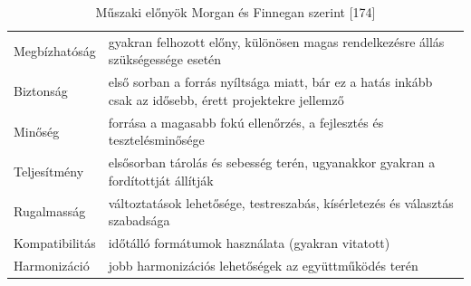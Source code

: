 \documentclass[12pt,magyar,a4paper,oneside]{scrreprt}
\begin{document}
\hypertarget{tbl:Elux151ny}{}
\begin{longtable}[]{@{}ll@{}}
\caption{\label{tbl:Elux151ny}Műszaki előnyök Morgan és Finnegan szerint
{[}174{]}}\tabularnewline
\toprule
\endhead
\begin{minipage}[t]{0.14\columnwidth}\raggedright
Megbízhatóság\strut
\end{minipage} & \begin{minipage}[t]{0.81\columnwidth}\raggedright
gyakran felhozott előny, különösen magas rendelkezésre állás
szükségessége esetén\strut
\end{minipage}\tabularnewline
\begin{minipage}[t]{0.14\columnwidth}\raggedright
Biztonság\strut
\end{minipage} & \begin{minipage}[t]{0.81\columnwidth}\raggedright
első sorban a forrás nyíltsága miatt, bár ez a hatás inkább csak az
idősebb, érett projektekre jellemző\strut
\end{minipage}\tabularnewline
\begin{minipage}[t]{0.14\columnwidth}\raggedright
Minőség\strut
\end{minipage} & \begin{minipage}[t]{0.81\columnwidth}\raggedright
forrása a magasabb fokú ellenőrzés, a fejlesztés és
tesztelésminősége\strut
\end{minipage}\tabularnewline
\begin{minipage}[t]{0.14\columnwidth}\raggedright
Teljesítmény\strut
\end{minipage} & \begin{minipage}[t]{0.81\columnwidth}\raggedright
elsősorban tárolás és sebesség terén, ugyanakkor gyakran a fordítottját
állítják\strut
\end{minipage}\tabularnewline
\begin{minipage}[t]{0.14\columnwidth}\raggedright
Rugalmasság\strut
\end{minipage} & \begin{minipage}[t]{0.81\columnwidth}\raggedright
változtatások lehetősége, testreszabás, kísérletezés és választás
szabadsága\strut
\end{minipage}\tabularnewline
\begin{minipage}[t]{0.14\columnwidth}\raggedright
Kompatibilitás\strut
\end{minipage} & \begin{minipage}[t]{0.81\columnwidth}\raggedright
időtálló formátumok használata (gyakran vitatott)\strut
\end{minipage}\tabularnewline
\begin{minipage}[t]{0.14\columnwidth}\raggedright
Harmonizáció\strut
\end{minipage} & \begin{minipage}[t]{0.81\columnwidth}\raggedright
jobb harmonizációs lehetőségek az együttműködés terén\strut
\end{minipage}\tabularnewline
\bottomrule
\end{longtable}
\end{document}

